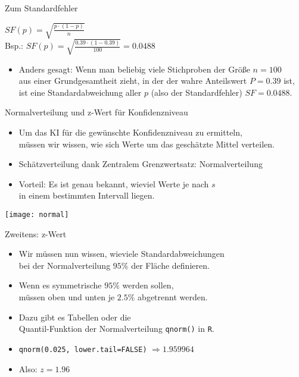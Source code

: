 \begin{frame}
  {Zum Standardfehler}
  \begin{center}
    \alert{$SF(p)=\sqrt{\frac{p\cdot(1-p)}{n}}$}\\

    \vspace{.1cm}
    Bsp.: $SF(p)=\sqrt{\frac{0.39\cdot(1-0.39)}{100}}=0.0488$
  \end{center}

  \vspace{.2cm}
  \pause
  \begin{itemize}[<+->]
    \item Anders gesagt: Wenn man beliebig viele Stichproben der Größe $n=100$\\
      aus einer Grundgesamtheit zieht, in der der \alert{wahre Anteilswert} $P=0.39$ ist,\\
      ist eine Standardabweichung aller $p$ (also der Standardfehler) $SF=0.0488$.
  \end{itemize}
\end{frame}

\begin{frame}
  {Normalverteilung und z-Wert für Konfidenzniveau}
  \begin{itemize}[<+->]
    \item Um das KI für die gewünschte Konfidenzniveau zu ermitteln,\\
      müssen wir wissen, wie sich Werte um das geschätzte Mittel verteilen.
    \item Schätzverteilung dank Zentralem Grenzwertsatz: \alert{Normalverteilung}
    \item Vorteil: Es ist genau bekannt, wieviel Werte je nach $s$\\
      in einem bestimmten Intervall liegen.
  \end{itemize}
  \pause
  \begin{center}
    \texttt{[image: normal]}
  \end{center}
\end{frame}

\begin{frame}
  {Zweitens: z-Wert}
  \begin{itemize}[<+->]
    \item Wir müssen nun wissen, wieviele Standardabweichungen\\
      bei der Normalverteilung $95\%$ der Fläche definieren.
    \item Wenn es \alert{symmetrische $95\%$} werden sollen,\\
      müssen \alert{oben und unten je $2.5\%$} abgetrennt werden.
    \item Dazu gibt es Tabellen oder die\\
      \alert{Quantil-Funktion der Normalverteilung \texttt{qnorm()}} in \texttt{R}.
    \item \texttt{qnorm(0.025, lower.tail=FALSE)} $\Rightarrow 1.959964$
    \item Also: \alert{$z=1.96$}
  \end{itemize}
\end{frame}

